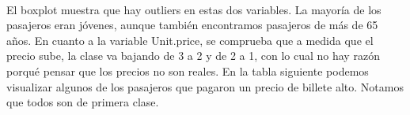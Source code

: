 \documentclass[
]{article}
\newenvironment{Shaded}{\begin{snugshade}}{\end{snugshade}}
\newcommand{\CommentTok}[1]{\textcolor[rgb]{0.56,0.35,0.01}{\textit{#1}}}
\newcommand{\DataTypeTok}[1]{\textcolor[rgb]{0.13,0.29,0.53}{#1}}
\newcommand{\DecValTok}[1]{\textcolor[rgb]{0.00,0.00,0.81}{#1}}
\newcommand{\KeywordTok}[1]{\textcolor[rgb]{0.13,0.29,0.53}{\textbf{#1}}}
\newcommand{\NormalTok}[1]{#1}
\newcommand{\OperatorTok}[1]{\textcolor[rgb]{0.81,0.36,0.00}{\textbf{#1}}}
\newcommand{\StringTok}[1]{\textcolor[rgb]{0.31,0.60,0.02}{#1}}
\begin{document}
\texttt{}~\\
\texttt{}

El boxplot muestra que hay outliers en estas dos variables. La mayoría
de los pasajeros eran jóvenes, aunque también encontramos pasajeros de
más de 65 años. En cuanto a la variable Unit.price, se comprueba que a
medida que el precio sube, la clase va bajando de 3 a 2 y de 2 a 1, con
lo cual no hay razón porqué pensar que los precios no son reales. En la
tabla siguiente podemos visualizar algunos de los pasajeros que pagaron
un precio de billete alto. Notamos que todos son de primera clase.
\texttt{}

\begin{Shaded}
\end{Shaded}
\end{document}
